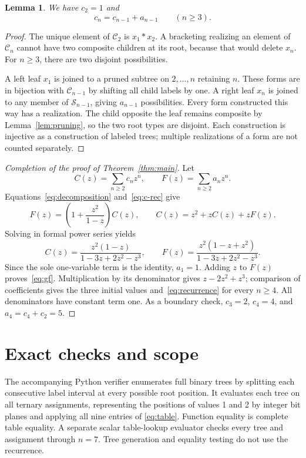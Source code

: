 \documentclass[11pt]{amsart}
\newtheorem{lemma}[theorem]{Lemma}
\newcommand{\Sset}{\mathcal{S}}
\newcommand{\Cset}{\mathcal{C}}
\begin{document}
\begin{lemma}\label{lem:count}
We have \(c_2=1\) and
\begin{equation}\label{eq:c-rec}
 c_n=c_{n-1}+a_{n-1}\qquad(n\geq3).
\end{equation}
\end{lemma}
\begin{proof}
The unique element of \(\Cset_2\) is \(x_1*x_2\). A bracketing
realizing an element of \(\Cset_n\) cannot have two composite
children at its root, because that would delete \(x_n\).
For \(n\geq3\), there are two disjoint possibilities.

A left leaf \(x_1\) is joined to a pruned subtree on
\(2,\ldots,n\) retaining \(n\). These forms are in bijection with
\(\Cset_{n-1}\) by shifting all child labels by one. A right leaf
\(x_n\) is joined to any member of \(\Sset_{n-1}\), giving
\(a_{n-1}\) possibilities. Every form constructed this way has a
realization. The child opposite the leaf remains composite by
Lemma~\ref{lem:pruning}, so the two root types are disjoint. Each
construction is injective as a construction of labeled trees; multiple
realizations of a form are not counted separately.
\end{proof}

\begin{proof}[Completion of the proof of Theorem~\ref{thm:main}]
Let
\[
 C(z)=\sum_{n\geq2}c_nz^n,\qquad F(z)=\sum_{n\geq2}a_nz^n.
\]
Equations~\eqref{eq:decomposition} and~\eqref{eq:c-rec} give
\[
 F(z)=\left(1+\frac{z^2}{1-z}\right)C(z),\qquad
 C(z)=z^2+zC(z)+zF(z).
\]
Solving in formal power series yields
\[
 C(z)=\frac{z^2(1-z)}{1-3z+2z^2-z^3},\qquad
 F(z)=\frac{z^2(1-z+z^2)}{1-3z+2z^2-z^3}.
\]
Since the sole one-variable term is the identity, \(a_1=1\).
Adding \(z\) to \(F(z)\) proves~\eqref{eq:gf}. Multiplication by
its denominator gives \(z-2z^2+z^3\); comparison of coefficients
gives the three initial values and~\eqref{eq:recurrence} for every
\(n\geq4\). All denominators have constant term one. As a boundary
check, \(c_3=2\), \(c_4=4\), and \(a_4=c_4+c_2=5\).
\end{proof}

\section{Exact checks and scope}

The accompanying Python verifier enumerates full binary trees by splitting
each consecutive label interval at every possible root position.
It evaluates each tree on all ternary assignments, representing the positions
of values 1 and 2 by integer bit planes and applying all nine entries of
\eqref{eq:table}. Function equality is complete table equality. A separate
scalar table-lookup evaluator checks every tree and assignment through
\(n=7\). Tree generation and equality testing do not use the recurrence.
\end{document}

